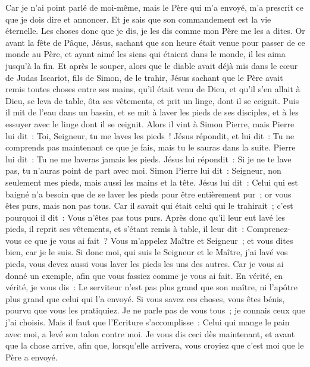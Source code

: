 \begin{multicols}{2}
Car je n'ai point parlé de moi-même, mais le Père qui m'a envoyé, m'a prescrit ce que je dois dire et annoncer.
Et je sais que son commandement est la vie éternelle. Les choses donc que je dis, je les dis comme mon Père me les a dites.
\VerseOne{}Or avant la fête de Pâque, Jésus, sachant que son heure était venue pour passer de ce monde au Père, et ayant aimé les siens qui étaient dans le monde, il les aima jusqu'à la fin.
Et après le souper, alors que le diable avait déjà mis dans le cœur de Judas Iscariot, fils de Simon, de le trahir,
Jésus sachant que le Père avait remis toutes choses entre ses mains, qu'il était venu de Dieu, et qu'il s'en allait à Dieu,
se leva de table, ôta ses vêtements, et prit un linge, dont il se ceignit.
Puis il mit de l'eau dans un bassin, et se mit à laver les pieds de ses disciples, et à les essuyer avec le linge dont il se ceignit.
Alors il vint à Simon Pierre, mais Pierre lui dit~: Toi, Seigneur, tu me laves les pieds~!
Jésus répondit, et lui dit~: Tu ne comprends pas maintenant ce que je fais, mais tu le sauras dans la suite.
Pierre lui dit~: Tu ne me laveras jamais les pieds. Jésus lui répondit~: Si je ne te lave pas, tu n'auras point de part avec moi.
Simon Pierre lui dit~: Seigneur, non seulement mes pieds, mais aussi les mains et la tête.
Jésus lui dit~: Celui qui est baigné n'a besoin que de se laver les pieds pour être entièrement pur~; or vous êtes purs, mais non pas tous.
Car il savait qui était celui qui le trahirait~; c'est pourquoi il dit~: Vous n'êtes pas tous purs.
Après donc qu'il leur eut lavé les pieds, il reprit ses vêtements, et s'étant remis à table, il leur dit~: Comprenez-vous ce que je vous ai fait~?
Vous m'appelez Maître et Seigneur~; et vous dites bien, car je le suis.
Si donc moi, qui suis le Seigneur et le Maître, j'ai lavé vos pieds, vous devez aussi vous laver les pieds les uns des autres.
Car je vous ai donné un exemple, afin que vous fassiez comme je vous ai fait.
En vérité, en vérité, je vous dis~: Le serviteur n'est pas plus grand que son maître, ni l'apôtre plus grand que celui qui l'a envoyé.
Si vous savez ces choses, vous êtes bénis, pourvu que vous les pratiquiez.
Je ne parle pas de vous tous~; je connais ceux que j'ai choisis. Mais il faut que l'Ecriture s'accomplisse~: Celui qui mange le pain avec moi, a levé son talon contre moi.
Je vous dis ceci dès maintenant, et avant que la chose arrive, afin que, lorsqu'elle arrivera, vous croyiez que c'est moi que le Père a envoyé.

\end{multicols}
